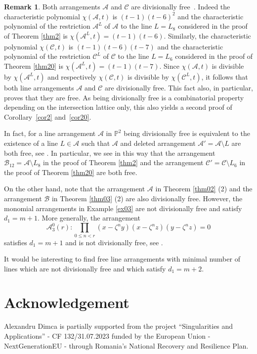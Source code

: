 \documentclass[12pt]{amsart}
\theoremstyle{plain}
\theoremstyle{definition}
\newtheorem{rk}[subsection]{Remark}
\numberwithin{equation}{section}
\newcommand{\A}{{\mathcal A}}
\newcommand{\B}{{\mathcal B}}
\newcommand{\CC}{{\mathcal C}}
\newcommand{\PP}{\mathbb{P}}
\begin{document}
\begin{rk}
\label{rkDF}
    Both arrangements $\A$ and $\CC$ are divisionally free~\cite{DivFree}. Indeed the characteristic polynomial $\chi(\A,t)$ is 
    $(t-1)(t-6)^2$ and the characteristic polynomial of the restriction $\A^L$ of $\A$ to the line $L=L_8$ considered in the proof of Theorem \ref{thm2} is $\chi(\A^L,t)=(t-1)(t-6)$. Similarly, the characteristic polynomial $\chi(\mathcal{C},t)$ is 
    $(t-1)(t-6)(t-7)$ and the characteristic polynomial of the restriction $\CC^L$ of $\CC$ to the line $L=L_6$ considered in the proof of Theorem \ref{thm20} is $\chi(\A^L,t)=(t-1)(t-7)$. Since $\chi(\A,t)$ is divisible by
    $\chi(\A^L,t)$ and respectively $\chi(\CC,t)$ is divisible by
    $\chi(\CC^L,t)$, it follows that both line arrangements $\A$ and $\CC$ are divisionally free.
This fact also, in particular, proves that they are free.
As being divisionally free is a combinatorial property depending on the intersection lattice only, this also yields a second proof of Corollary~\ref{cor2} and~\ref{cor20}. 

In fact, for a line arrangement $\A$ in $\PP^2$ being divisionally free is equivalent to the existence of a line $L \in \A$ such that $\A$ and deleted arrangement $\A'=\A \setminus L$ are both free, see \cite[Theorem  3.11]{DivFree}. In particular, we see in this way that the arrangement $\B_{12}=\A \setminus L_8$ in the proof of Theorem \ref{thm2} and the arrangement $\CC'=\CC \setminus L_6$ in the proof of Theorem \ref{thm20} are both free.
        
On the other hand, note that the arrangement $\A$ in Theorem \ref{thm02} (2) and the arrangement $\B$ in Theorem \ref{thm03} (2)
are also divisionally free. However, the monomial arrangements in Example \ref{ex03} are not divisionally free and  satisfy $d_1=m+1$.
More generally, the arrangement
$$\A^0_3(r): \prod_{0\leq n <r}(x-\zeta^ny)(x-\zeta^nz)(y-\zeta^nz)=0 $$
satisfies $d_1=m+1$ and is not divisionally free, see \cite[Theorem 5.6]{DivFree}.

It would be interesting to find free line arrangements with minimal number of lines which are not divisionally free and which satisfy  $d_1=m+2$.

\end{rk}

\section*{Acknowledgement}

Alexandru Dimca is partially supported from the project ``Singularities and Applications'' - CF 132/31.07.2023 funded by the European Union - NextGenerationEU - through Romania's National Recovery and Resilience Plan.
\end{document}
